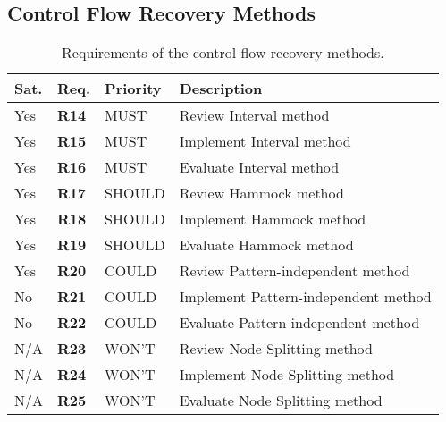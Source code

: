 
\subsection{Control Flow Recovery Methods}


\begin{table}[htbp]
	\begin{center}
		\begin{tabular}{|l|l|l|l|}
			\hline
			Sat. & Req. & Priority & Description \\
			\hline
			\rowcolor{light_green_3}
			Yes & \textbf{R14} & MUST & Review Interval method \\
			\rowcolor{light_green_3}
			Yes & \textbf{R15} & MUST & Implement Interval method \\
			\rowcolor{light_green_3}
			Yes & \textbf{R16} & MUST & Evaluate Interval method \\
			\hline
			\rowcolor{light_green_3}
			Yes & \textbf{R17} & SHOULD & Review Hammock method \\
			\rowcolor{light_green_3}
			Yes & \textbf{R18} & SHOULD & Implement Hammock method \\
			\rowcolor{light_green_3}
			Yes & \textbf{R19} & SHOULD & Evaluate Hammock method \\
			\hline
			\rowcolor{light_green_3}
			Yes & \textbf{R20} & COULD & Review Pattern-independent method \\
			\rowcolor{light_red_3}
			No & \textbf{R21} & COULD & Implement Pattern-independent method \\
			\rowcolor{light_red_3}
			No & \textbf{R22} & COULD & Evaluate Pattern-independent method \\
			\hline
			N/A & \textbf{R23} & WON'T & Review Node Splitting method \\
			N/A & \textbf{R24} & WON'T & Implement Node Splitting method \\
			N/A & \textbf{R25} & WON'T & Evaluate Node Splitting method \\
			\hline
		\end{tabular}
	\end{center}
	\caption{Requirements of the control flow recovery methods.}
	\label{tbl:eval_summary_of_control_flow_recovery_methods}
\end{table}
